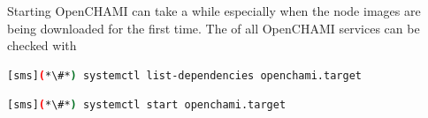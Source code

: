 Starting OpenCHAMI can take a while especially when the node images are being downloaded for the first time.
The of all OpenCHAMI services can be checked with
\begin{lstlisting}[language=bash,keywords={}]
[sms](*\#*) systemctl list-dependencies openchami.target
\end{lstlisting}

\begin{lstlisting}[language=bash,keywords={}]
[sms](*\#*) systemctl start openchami.target
\end{lstlisting}
